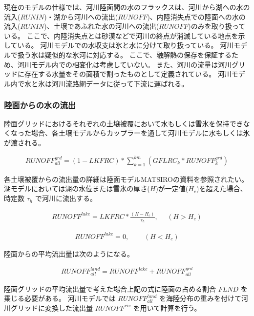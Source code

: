 現在のモデルの仕様では、河川陸面間の水のフラックスは、河川から湖への水の流入(\(RUNIN\))・湖から河川への流出(\(RUNOFF\))、内陸消失点での陸面への水の流入(\(RUNIN\))、土壌であふれた水の河川への流出(\(RUNOFF\))のみを取り扱っている。
ここで、内陸消失点とは砂漠などで河川の終点が消滅している地点を示している。
河川モデルでの水収支は氷と水に分けて取り扱っている。
河川モデルで扱う氷は疑似的な氷河に対応する。
ここで、融解熱の保存を保証するため、河川モデル内での相変化は考慮していない。
また、河川の流量は河川グリッドに存在する水量をその面積で割ったものとして定義されている。
河川モデル内で水と氷は河川流路網データに従って下流に運ばれる。

\hypertarget{ux9678ux9762ux304bux3089ux306eux6c34ux306eux6d41ux51fa}{%
\subsubsection{陸面からの水の流出}\label{ux9678ux9762ux304bux3089ux306eux6c34ux306eux6d41ux51fa}}

陸面グリッドにおけるそれぞれの土壌被覆において水もしくは雪氷を保持できなくなった場合、各土壌モデルからカップラーを通して河川モデルに水もしくは氷が渡される。

\begin{eqnarray} RUNOFF^{grd}_{all} = 
    (1-LKFRC) * \sum_{k=1}^{km}(GFLRC_{k} * RUNOFF^{grd}_{k}) \end{eqnarray}

各土壌被覆からの流出量の詳細は陸面モデルMATSIROの資料を参照されたい。
湖モデルにおいては湖の水位または雪氷の厚さ(\(H\))が一定値(\(H_c\))を超えた場合、時定数
\(\tau_h\) で河川に流出する。

\begin{eqnarray} RUNOFF^{lake} = LKFRC * \frac{(H-H_c)}{\tau_h},~~~~~~ (H>H_c) \end{eqnarray}

\begin{eqnarray} RUNOFF^{lake} = 0,~~~~~~~~~~ (H<H_c) \end{eqnarray}

陸面からの平均流出量は次のようになる。

\begin{eqnarray} RUNOFF^{land}_{all} = RUNOFF^{lake} + RUNOFF^{grd}_{all} \end{eqnarray}

陸面グリッドの平均流出量で考えた場合上記の式に陸面の占める割合 \(FLND\)
を乗じる必要がある。 河川モデルでは \(RUNOFF^{land}_{all}\)
を海陸分布の重みを付けて河川グリッドに変換した流出量 \(RUNOFF^{riv}\)
を用いて計算を行う。

